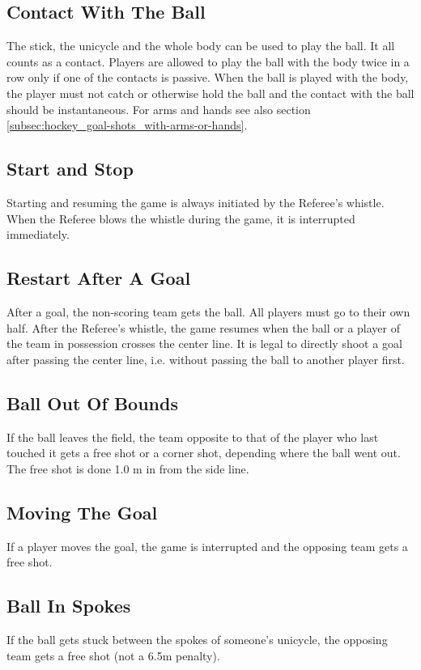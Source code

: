 \subsection{Contact With The Ball}
The stick, the unicycle and the whole body can be used to play the ball.
It all counts as a contact.
Players are allowed to play the ball with the body twice in a row only if one of the contacts is passive.
When the ball is played with the body, the player must not catch or otherwise hold the ball and the contact with the ball should be instantaneous.
For arms and hands see also section \ref{subsec:hockey_goal-shots_with-arms-or-hands}.

\subsection{Start and Stop}
Starting and resuming the game is always initiated by the Referee's whistle.
When the Referee blows the whistle during the game, it is interrupted immediately.

\subsection{Restart After A Goal}
After a goal, the non-scoring team gets the ball.
All players must go to their own half.
After the Referee's whistle, the game resumes when the ball or a player of the team in possession crosses the center line.
It is legal to directly shoot a goal after passing the center line, i.e. without passing the ball to another player first.

\subsection{Ball Out Of Bounds}
If the ball leaves the field, the team opposite to that of the player who last touched it gets a free shot or a corner shot, depending where the ball went out.
The free shot is done 1.0 m in from the side line.

\subsection{Moving The Goal}
If a player moves the goal, the game is interrupted and the opposing team gets a free shot.

\subsection{Ball In Spokes}
If the ball gets stuck between the spokes of someone's unicycle, the opposing team gets a free shot (not a 6.5m penalty).

